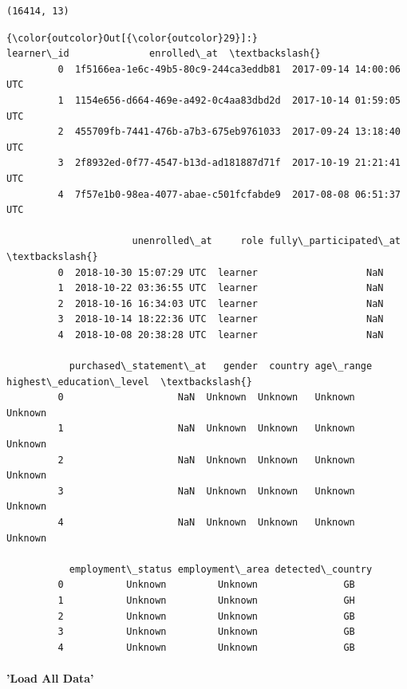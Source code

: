 \documentclass[11pt]{article}
\begin{document}
    \begin{Verbatim}[commandchars=\\\{\}]
(16414, 13)

    \end{Verbatim}

\begin{Verbatim}[commandchars=\\\{\}]
{\color{outcolor}Out[{\color{outcolor}29}]:}                              learner\_id              enrolled\_at  \textbackslash{}
         0  1f5166ea-1e6c-49b5-80c9-244ca3eddb81  2017-09-14 14:00:06 UTC   
         1  1154e656-d664-469e-a492-0c4aa83dbd2d  2017-10-14 01:59:05 UTC   
         2  455709fb-7441-476b-a7b3-675eb9761033  2017-09-24 13:18:40 UTC   
         3  2f8932ed-0f77-4547-b13d-ad181887d71f  2017-10-19 21:21:41 UTC   
         4  7f57e1b0-98ea-4077-abae-c501fcfabde9  2017-08-08 06:51:37 UTC   
         
                      unenrolled\_at     role fully\_participated\_at  \textbackslash{}
         0  2018-10-30 15:07:29 UTC  learner                   NaN   
         1  2018-10-22 03:36:55 UTC  learner                   NaN   
         2  2018-10-16 16:34:03 UTC  learner                   NaN   
         3  2018-10-14 18:22:36 UTC  learner                   NaN   
         4  2018-10-08 20:38:28 UTC  learner                   NaN   
         
           purchased\_statement\_at   gender  country age\_range highest\_education\_level  \textbackslash{}
         0                    NaN  Unknown  Unknown   Unknown                 Unknown   
         1                    NaN  Unknown  Unknown   Unknown                 Unknown   
         2                    NaN  Unknown  Unknown   Unknown                 Unknown   
         3                    NaN  Unknown  Unknown   Unknown                 Unknown   
         4                    NaN  Unknown  Unknown   Unknown                 Unknown   
         
           employment\_status employment\_area detected\_country  
         0           Unknown         Unknown               GB  
         1           Unknown         Unknown               GH  
         2           Unknown         Unknown               GB  
         3           Unknown         Unknown               GB  
         4           Unknown         Unknown               GB  
\end{Verbatim}
            
    \paragraph{'Load All Data'}\label{load-all-data}
\end{document}
